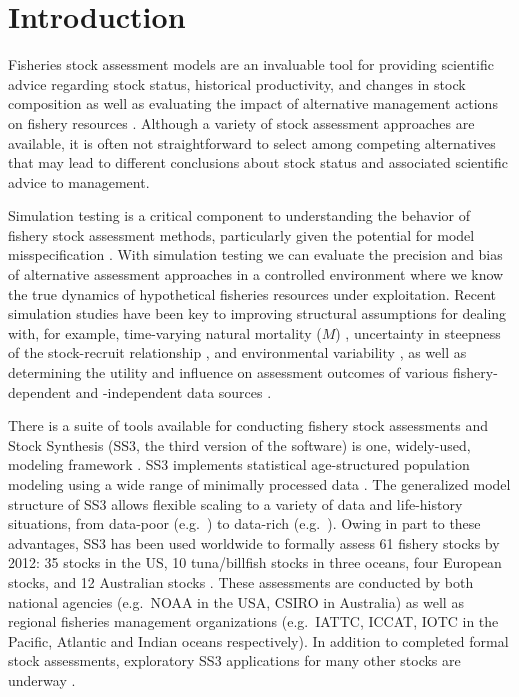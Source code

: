 \documentclass[10pt]{article}
\newcommand{\R}[1]{\label{#1}\linelabel{#1}}
\begin{document}
\section*{Introduction}

Fisheries stock assessment models are \R{B5}an invaluable tool for providing
scientific advice \R{B6}regarding stock status, historical productivity, and
changes in stock composition as well as evaluating the impact of alternative
management actions on fishery resources \cite{gulland1983, hilborn1992}.
Although a variety of stock assessment approaches are available, it is often
not straightforward to \R{B7}select among competing alternatives that may lead
to different \R{B8}conclusions about stock status and associated scientific
advice to management.

Simulation testing is a critical component to understanding the behavior of
fishery stock assessment methods, particularly given the potential for model
misspecification \cite{hilborn1987, hilborn1992, rosenberg1994, peterman2004,
  deroba2014}. With simulation testing we can evaluate the precision and bias
of alternative assessment approaches in a controlled environment where we know
the true dynamics of hypothetical fisheries resources under exploitation.
Recent simulation studies have been key to improving \R{B9}structural
assumptions for dealing with, for example, time-varying natural mortality ($M$)
\cite{lee2011, jiao2012, deroba2013, johnson2014}, \R{B10}uncertainty in
steepness of the stock-recruit relationship \cite{lee2012}, and environmental
variability \cite{schirripa2009}, as well as determining \R{B11}the utility and
influence on assessment outcomes of various fishery-dependent and -independent
data sources \cite{magnusson2007, wetzel2011a, ono2014, yin2004}.

There \R{E1}is a suite of tools available for conducting fishery stock
assessments and Stock Synthesis (SS3, the third version of the software) is
one, widely-used, modeling framework \cite{methot2013}. SS3 implements
statistical age-structured population modeling using a wide range of minimally
processed data \cite{maunder2013, methot2013}. \R{A1:1}The generalized model
structure of SS3 allows flexible scaling to a variety of data and life-history
situations, \R{A1:3}from data-poor (e.g.~\cite{wetzel2011a, cope2013}) to
data-rich (e.g.~\cite{haltuch2013}). Owing in part to these advantages,
\R{A3}SS3 has been used worldwide to formally assess 61 fishery stocks by 2012:
35 stocks in the US, 10 tuna/billfish stocks in three oceans, four European
stocks, and 12 Australian stocks \cite{methot2013}. These assessments are
conducted by both national agencies (e.g.~NOAA in the USA, CSIRO in Australia)
as well as regional fisheries management organizations (e.g.~IATTC, ICCAT, IOTC
in the Pacific, Atlantic and Indian oceans respectively). In addition to
completed formal stock assessments, exploratory SS3 applications for many other
stocks are underway \cite{methot2013}.
\end{document}
